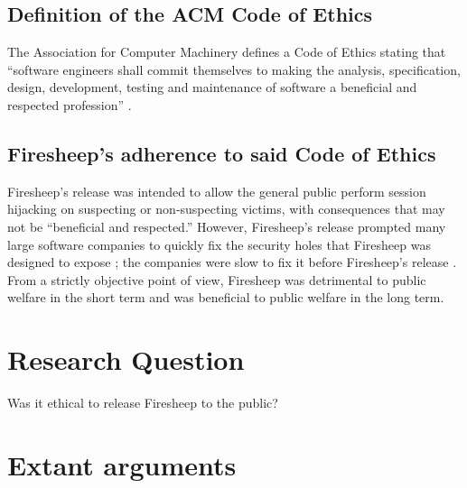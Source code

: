 \documentclass[12pt]{article}
\begin{document}
\subsection{Definition of the ACM Code of Ethics}
The Association for Computer Machinery defines a Code of Ethics stating that ``software engineers shall commit themselves to making the analysis, specification, design, development, testing and maintenance of software a beneficial and respected profession'' \cite{se-code}. 

\subsection{Firesheep's adherence to said Code of Ethics}
Firesheep's release was intended to allow the general public perform session hijacking on suspecting or non-suspecting victims, with consequences that may not be ``beneficial and respected.'' However, Firesheep's release prompted many large software companies to quickly fix the security holes that Firesheep was designed to expose \cite{disconnect-blog}; the companies were slow to fix it before Firesheep's release \cite{disconnect-blog}. From a strictly objective point of view, Firesheep was detrimental to public welfare in the short term and was beneficial to public welfare in the long term.


\section{Research Question}

Was it ethical to release Firesheep to the public?



\section{Extant arguments}
\end{document}
